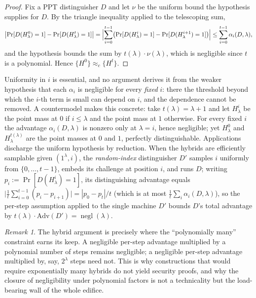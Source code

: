 \documentclass[11pt,a4paper]{article}
\theoremstyle{definition}
\theoremstyle{remark}
\newtheorem{remark}[theorem]{Remark}
\DeclareMathOperator{\negl}{negl}
\begin{document}
\begin{proof}
Fix a PPT distinguisher \(D\) and let \(\nu\) be the uniform bound the hypothesis
supplies for \(D\). By the triangle inequality applied to the
telescoping sum,
\[
  \bigl|\Pr[D(H^0_\lambda)=1]-\Pr[D(H^t_\lambda)=1]\bigr|
  = \Bigl| \sum_{i=0}^{t-1}\bigl(\Pr[D(H^i_\lambda)=1]-\Pr[D(H^{i+1}_\lambda)=1]\bigr)\Bigr|
  \leq \sum_{i=0}^{t-1} \alpha_i(D,\lambda),
\]
and the hypothesis bounds the sum by \(t(\lambda)\cdot\nu(\lambda)\), which is
negligible since \(t\) is
a polynomial. Hence \(\{H^0\}\approx_c\{H^t\}\).
\end{proof}

Uniformity in \(i\) is essential, and no argument derives it from the weaker
hypothesis that each \(\alpha_i\) is negligible for every \emph{fixed} \(i\):
there the threshold beyond which the \(i\)-th term is small can depend on \(i\),
and the dependence cannot be removed. A countermodel makes this concrete: take
\(t(\lambda) = \lambda + 1\) and let \(H^i_\lambda\) be the point mass at \(0\)
if \(i \le \lambda\) and the point mass at \(1\) otherwise. For every fixed
\(i\) the advantage \(\alpha_i(D,\lambda)\) is nonzero only at \(\lambda = i\),
hence negligible; yet \(H^0_\lambda\) and \(H^{t(\lambda)}_\lambda\) are the
point masses at \(0\) and \(1\), perfectly distinguishable. Applications
discharge the uniform hypothesis by reduction. When the hybrids are efficiently
samplable given \((1^\lambda, i)\), the \emph{random-index} distinguisher
\(D'\) samples \(i\) uniformly from \(\{0,\dots,t-1\}\), embeds its challenge at
position \(i\), and runs \(D\); writing \(p_i := \Pr[D(H^i_\lambda)=1]\), its
distinguishing advantage equals
\(\bigl|\frac{1}{t}\sum_{i=0}^{t-1}(p_i - p_{i+1})\bigr| = |p_0 - p_t|/t\)
(which is at most \(\frac{1}{t}\sum_i \alpha_i(D,\lambda)\)), so the per-step
assumption applied to the single machine \(D'\) bounds \(D\)'s total advantage
by \(t(\lambda)\cdot\mathrm{Adv}(D') = \negl(\lambda)\).

\begin{remark}\label{model:rem:hybrid-poly}
The hybrid argument is precisely where the ``polynomially many'' constraint earns
its keep. A negligible
per-step advantage multiplied by a polynomial number of steps remains negligible; a
negligible per-step advantage multiplied by, say, \(2^\lambda\) steps need not.
This is why constructions that would require exponentially many hybrids do not
yield security proofs, and why the closure of negligibility under polynomial
factors is not a technicality but the
load-bearing wall of the whole edifice.
\end{remark}
\end{document}
